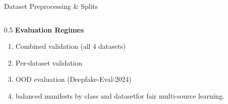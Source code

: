 \documentclass[aspectratio=169,12pt]{beamer}
\begin{document}
\begin{frame}{Dataset Preprocessing \& Splits}
\begin{columns}[T]
\begin{column}{0.5\textwidth}
\textbf{Evaluation Regimes}
\begin{enumerate}
\setlength\itemsep{0.08em}
    \item Combined validation (all 4 datasets)
    \item Per-dataset validation
    \item OOD evaluation (Deepfake-Eval-2024)
    \item balanced manifests by class and datasetfor fair multi-source learning.
\end{enumerate}
\end{column}
\end{columns}
\end{frame}

\end{document}

